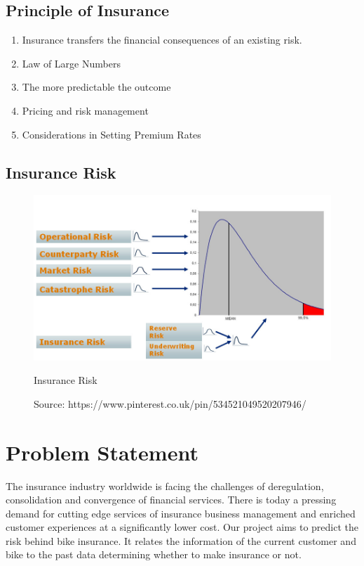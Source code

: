 \subsection{Principle of Insurance}
\begin{enumerate}
\item Insurance transfers the financial consequences of an existing risk.
\item Law of Large Numbers
\item The more predictable the outcome
\item Pricing and risk management
\item Considerations in Setting Premium Rates
\end{enumerate}

\newpage
\subsection{Insurance Risk}

\begin{figure}[tbh] %
\begin{center}
	\includegraphics[width = 5in]{images/ir.png}
	\caption{Insurance Risk} %
	\caption*{Source: https://www.pinterest.co.uk/pin/534521049520207946/}

	\label{Risk type}%
\end{center}
\end{figure}

\section{Problem Statement}
The insurance industry worldwide is facing the challenges of deregulation, consolidation and convergence of financial services. There is today a pressing demand for cutting edge services of insurance business management and enriched customer experiences at a significantly lower cost. Our project aims to predict the risk behind bike insurance. It relates the information of the current customer and bike to the past data determining whether to make insurance or not.


